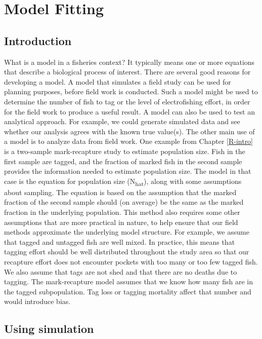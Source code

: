 \documentclass[
]{krantz}
\begin{document}
\hypertarget{Model-fit}{%
\chapter{Model Fitting}\label{Model-fit}}

\hypertarget{introduction-1}{%
\section{Introduction}\label{introduction-1}}

What is a model in a fisheries context? It typically means one or more equations that describe a biological process of interest. There are several good reasons for developing a model. A model that simulates a field study can be used for planning purposes, before field work is conducted. Such a model might be used to determine the number of fish to tag or the level of electrofishing effort, in order for the field work to produce a useful result. A model can also be used to test an analytical approach. For example, we could generate simulated data and see whether our analysis agrees with the known true value(s). The other main use of a model is to analyze data from field work. One example from Chapter \ref{R-intro} is a two-sample mark-recapture study to estimate population size. Fish in the first sample are tagged, and the fraction of marked fish in the second sample provides the information needed to estimate population size. The model in that case is the equation for population size (N\textsubscript{hat}), along with some assumptions about sampling. The equation is based on the assumption that the marked fraction of the second sample should (on average) be the same as the marked fraction in the underlying population. This method also requires some other assumptions that are more practical in nature, to help ensure that our field methods approximate the underlying model structure. For example, we assume that tagged and untagged fish are well mixed. In practice, this means that tagging effort should be well distributed throughout the study area so that our recapture effort does not encounter pockets with too many or too few tagged fish. We also assume that tags are not shed and that there are no deaths due to tagging. The mark-recapture model assumes that we know how many fish are in the tagged subpopulation. Tag loss or tagging mortality affect that number and would introduce bias.

\hypertarget{Model-fit-sim}{%
\section{Using simulation}\label{Model-fit-sim}}
\end{document}
